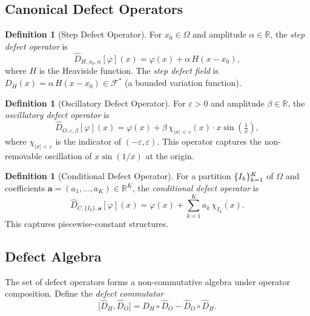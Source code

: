 \documentclass[12pt,a4paper]{article}
\theoremstyle{plain}
\theoremstyle{definition}
\newtheorem{definition}[theorem]{Definition}
\theoremstyle{remark}
\newcommand{\cF}{\mathcal{F}}
\newcommand{\R}{\mathbb{R}}
\newcommand{\abs}[1]{\left|#1\right|}
\newcommand{\Dhat}[1]{\hat{D}_{#1}}
\newcommand{\eps}{\varepsilon}
\DeclarePairedDelimiter{\set}{\{}{\}}
\begin{document}
\subsection{Canonical Defect Operators}

\begin{definition}[Step Defect Operator]
  For $x_0 \in \Omega$ and amplitude $\alpha \in \R$, the
  \emph{step defect operator} is
  \begin{equation}
    \Dhat{H,x_0,\alpha}[\varphi](x)
    = \varphi(x) + \alpha\,H(x - x_0),
    \label{eq:step_defect}
  \end{equation}
  where $H$ is the Heaviside function.  The \emph{step defect field} is
  $D_H(x) = \alpha\,H(x-x_0) \in \cF^*$ (a bounded variation function).
\end{definition}

\begin{definition}[Oscillatory Defect Operator]
  For $\eps > 0$ and amplitude $\beta \in \R$, the
  \emph{oscillatory defect operator} is
  \begin{equation}
    \Dhat{O,\eps,\beta}[\varphi](x)
    = \varphi(x) + \beta\,\chi_{\abs{x}<\eps}(x)\cdot x\sin\!\left(\tfrac{1}{x}\right),
    \label{eq:osc_defect}
  \end{equation}
  where $\chi_{\abs{x}<\eps}$ is the indicator of $(-\eps,\eps)$.
  This operator captures the non-removable oscillation of $x\sin(1/x)$
  at the origin.
\end{definition}

\begin{definition}[Conditional Defect Operator]
  For a partition $\set{I_k}_{k=1}^K$ of $\Omega$ and coefficients
  $\bm{a} = (a_1,\dots,a_K) \in \R^K$, the
  \emph{conditional defect operator} is
  \begin{equation}
    \Dhat{C,\{I_k\},\bm{a}}[\varphi](x)
    = \varphi(x) + \sum_{k=1}^K a_k\,\chi_{I_k}(x).
    \label{eq:cond_defect}
  \end{equation}
  This captures piecewise-constant structures.
\end{definition}

\subsection{Defect Algebra}

The set of defect operators forms a non-commutative algebra under
operator composition.  Define the \emph{defect commutator}
\begin{equation}
  \bigl[\Dhat{H}, \Dhat{O}\bigr]
  = \Dhat{H} \circ \Dhat{O} - \Dhat{O} \circ \Dhat{H}.
  \label{eq:commutator}
\end{equation}
\end{document}
